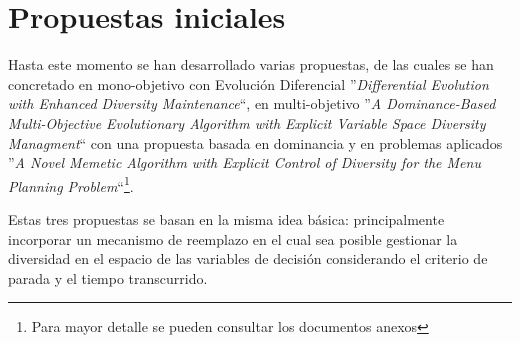 \section{Propuestas iniciales}

Hasta este momento se han desarrollado varias propuestas, de las cuales se han concretado en mono-objetivo con Evolución Diferencial ''\textit{Differential Evolution with Enhanced Diversity Maintenance}``, en multi-objetivo ''\textit{A Dominance-Based Multi-Objective Evolutionary Algorithm with Explicit Variable Space Diversity Managment}`` con una propuesta basada en dominancia y en problemas aplicados ''\textit{A Novel Memetic Algorithm with Explicit Control of Diversity for the Menu Planning Problem}``\footnote{Para mayor detalle se pueden consultar los documentos anexos}.
%

Estas tres propuestas se basan en la misma idea básica: principalmente incorporar un mecanismo de reemplazo en el cual sea posible gestionar la diversidad en el espacio de las variables de decisión considerando el criterio de parada y el tiempo transcurrido.
